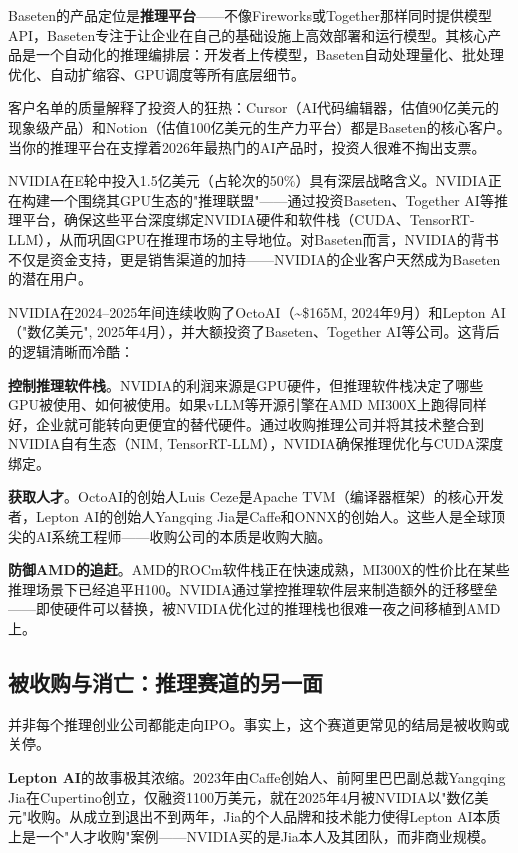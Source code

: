Baseten的产品定位是\textbf{推理平台}——不像Fireworks或Together那样同时提供模型API，Baseten专注于让企业在自己的基础设施上高效部署和运行模型。其核心产品是一个自动化的推理编排层：开发者上传模型，Baseten自动处理量化、批处理优化、自动扩缩容、GPU调度等所有底层细节。

客户名单的质量解释了投资人的狂热：Cursor（AI代码编辑器，估值90亿美元的现象级产品）和Notion（估值100亿美元的生产力平台）都是Baseten的核心客户。当你的推理平台在支撑着2026年最热门的AI产品时，投资人很难不掏出支票。

NVIDIA在E轮中投入1.5亿美元（占轮次的50\%）具有深层战略含义。NVIDIA正在构建一个围绕其GPU生态的"推理联盟"——通过投资Baseten、Together AI等推理平台，确保这些平台深度绑定NVIDIA硬件和软件栈（CUDA、TensorRT-LLM），从而巩固GPU在推理市场的主导地位。对Baseten而言，NVIDIA的背书不仅是资金支持，更是销售渠道的加持——NVIDIA的企业客户天然成为Baseten的潜在用户。

\begin{whybox}[为什么NVIDIA要系统性收购推理创业公司？]
NVIDIA在2024--2025年间连续收购了OctoAI（\textasciitilde\$165M, 2024年9月）和Lepton AI（"数亿美元", 2025年4月），并大额投资了Baseten、Together AI等公司。这背后的逻辑清晰而冷酷：

\textbf{控制推理软件栈}。NVIDIA的利润来源是GPU硬件，但推理软件栈决定了哪些GPU被使用、如何被使用。如果vLLM等开源引擎在AMD MI300X上跑得同样好，企业就可能转向更便宜的替代硬件。通过收购推理公司并将其技术整合到NVIDIA自有生态（NIM, TensorRT-LLM），NVIDIA确保推理优化与CUDA深度绑定。

\textbf{获取人才}。OctoAI的创始人Luis Ceze是Apache TVM（编译器框架）的核心开发者，Lepton AI的创始人Yangqing Jia是Caffe和ONNX的创始人。这些人是全球顶尖的AI系统工程师——收购公司的本质是收购大脑。

\textbf{防御AMD的追赶}。AMD的ROCm软件栈正在快速成熟，MI300X的性价比在某些推理场景下已经追平H100。NVIDIA通过掌控推理软件层来制造额外的迁移壁垒——即使硬件可以替换，被NVIDIA优化过的推理栈也很难一夜之间移植到AMD上。
\end{whybox}

\subsection{被收购与消亡：推理赛道的另一面}
\label{subsec:inference-exits}

并非每个推理创业公司都能走向IPO。事实上，这个赛道更常见的结局是被收购或关停。

\textbf{Lepton AI}的故事极其浓缩。2023年由Caffe创始人、前阿里巴巴副总裁Yangqing Jia在Cupertino创立，仅融资1100万美元，就在2025年4月被NVIDIA以"数亿美元"收购。从成立到退出不到两年，Jia的个人品牌和技术能力使得Lepton AI本质上是一个"人才收购"案例——NVIDIA买的是Jia本人及其团队，而非商业规模。

